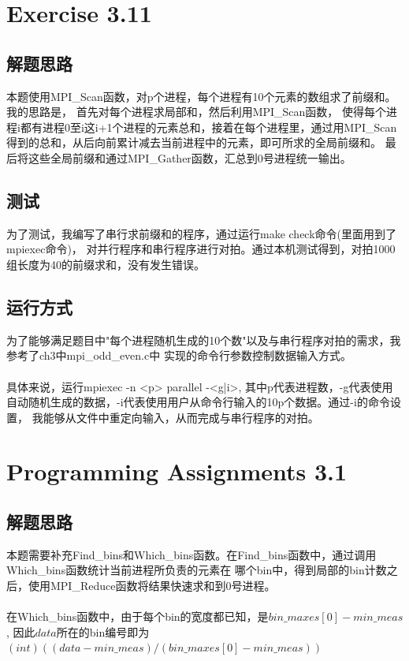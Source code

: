 \documentclass[UTF8]{article}
\begin{document}

\section{Exercise 3.11}
\subsection{解题思路}
本题使用MPI\_Scan函数，对p个进程，每个进程有10个元素的数组求了前缀和。我的思路是，
首先对每个进程求局部和，然后利用MPI\_Scan函数，
使得每个进程i都有进程0至i这i+1个进程的元素总和，接着在每个进程里，通过用MPI\_Scan
得到的总和，从后向前累计减去当前进程中的元素，即可所求的全局前缀和。
最后将这些全局前缀和通过MPI\_Gather函数，汇总到0号进程统一输出。

\subsection{测试}
为了测试，我编写了串行求前缀和的程序，通过运行make check命令(里面用到了mpiexec命令)，
对并行程序和串行程序进行对拍。通过本机测试得到，对拍1000组长度为40的前缀求和，没有发生错误。

\subsection{运行方式}
为了能够满足题目中"每个进程随机生成的10个数"以及与串行程序对拍的需求，我参考了ch3中mpi\_odd\_even.c中
实现的命令行参数控制数据输入方式。\\\\

具体来说，运行mpiexec -n <p> parallel -<g|i>, 其中p代表进程数，-g代表使用自动随机生成的数据，-i代表使用用户从命令行输入的10p个数据。通过-i的命令设置，
我能够从文件中重定向输入，从而完成与串行程序的对拍。

\section{Programming Assignments 3.1}
\subsection{解题思路}
本题需要补充Find\_bins和Which\_bins函数。在Find\_bins函数中，通过调用Which\_bins函数统计当前进程所负责的元素在
哪个bin中，得到局部的bin计数之后，使用MPI\_Reduce函数将结果快速求和到0号进程。\\\\
在Which\_bins函数中，由于每个bin的宽度都已知，是$bin\_maxes[0] - min\_meas$, 因此$data$所在的bin编号即为$(int)((data - min\_meas) / (bin\_maxes[0] - min\_meas))$
\end{document}
